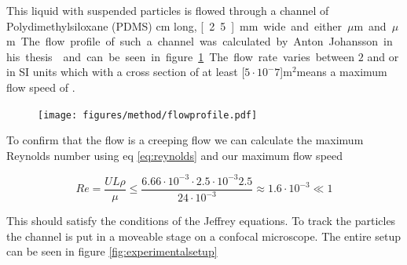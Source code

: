 This liquid with suspended particles is flowed through a channel of Polydimethylsiloxane (PDMS) \unit[4]{cm} long,
 \unit[2.5]{mm} wide and either \unit[200]{$\mu$m} and \unit[500]{$\mu$m}. The flow profile of such a channel was 
 calculated by Anton Johansson in his thesis\cite{AntonThesis} and can be seen in figure \ref{fig:flowprofile}. The 
 flow rate varies  between $2$ and  or in SI units  
 which with a cross section of at least \unit[$5\cdot 10^-7$]{m$^2$}means a maximum flow speed of  
 .

\begin{figure}[H]
\begin{center}
\texttt{[image: figures/method/flowprofile.pdf]}
\end{center}
\caption{}
\label{fig:flowprofile}
\end{figure}

            
To confirm that the flow is a creeping flow we can calculate the maximum Reynolds number using eq \ref{eq:reynolds} and our maximum flow speed 

\begin{equation}
Re = \frac{U L \rho}{\mu} 
\leq \frac{6.66\cdot 10^{-3} \cdot 2.5 \cdot 10^{-3} 2.5 }{24 \cdot 10^{-3}} 
\approx	 	1.6  \cdot 10^{-3} \ll 1
\end{equation}

This should satisfy the conditions of the Jeffrey equations. To track the particles the channel is put in a moveable stage on a confocal microscope. The entire setup can be seen in figure \ref{fig:experimentalsetup}


